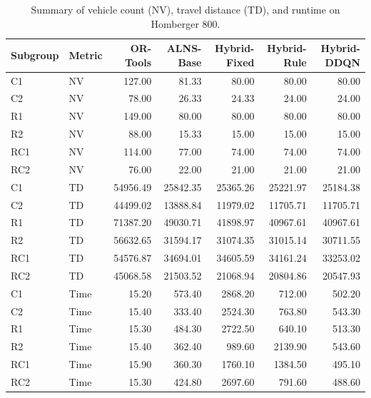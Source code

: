 \begin{table}[htbp]
\centering
\caption{Summary of vehicle count (NV), travel distance (TD), and runtime on Homberger 800.}
\label{tab:results_homberger_800}
\begin{tabular}{llrrrrr}
\hline
\textbf{Subgroup} & \textbf{Metric} & \textbf{OR-Tools} & \textbf{ALNS-Base} & \textbf{Hybrid-Fixed} & \textbf{Hybrid-Rule} & \textbf{Hybrid-DDQN} \\ \hline
C1 & NV & 127.00 & 81.33 & 80.00 & 80.00 & 80.00 \\
C2 & NV & 78.00 & 26.33 & 24.33 & 24.00 & 24.00 \\
R1 & NV & 149.00 & 80.00 & 80.00 & 80.00 & 80.00 \\
R2 & NV & 88.00 & 15.33 & 15.00 & 15.00 & 15.00 \\
RC1 & NV & 114.00 & 77.00 & 74.00 & 74.00 & 74.00 \\
RC2 & NV & 76.00 & 22.00 & 21.00 & 21.00 & 21.00 \\
C1 & TD & 54956.49 & 25842.35 & 25365.26 & 25221.97 & 25184.38 \\
C2 & TD & 44499.02 & 13888.84 & 11979.02 & 11705.71 & 11705.71 \\
R1 & TD & 71387.20 & 49030.71 & 41898.97 & 40967.61 & 40967.61 \\
R2 & TD & 56632.65 & 31594.17 & 31074.35 & 31015.14 & 30711.55 \\
RC1 & TD & 54576.87 & 34694.01 & 34605.59 & 34161.24 & 33253.02 \\
RC2 & TD & 45068.58 & 21503.52 & 21068.94 & 20804.86 & 20547.93 \\
C1 & Time & 15.20 & 573.40 & 2868.20 & 712.00 & 502.20 \\
C2 & Time & 15.40 & 333.40 & 2524.30 & 763.80 & 543.30 \\
R1 & Time & 15.30 & 484.30 & 2722.50 & 640.10 & 513.30 \\
R2 & Time & 15.40 & 362.40 & 989.60 & 2139.90 & 543.60 \\
RC1 & Time & 15.90 & 360.30 & 1760.10 & 1384.50 & 495.10 \\
RC2 & Time & 15.30 & 424.80 & 2697.60 & 791.60 & 488.60 \\
\hline
\end{tabular}
\end{table}


